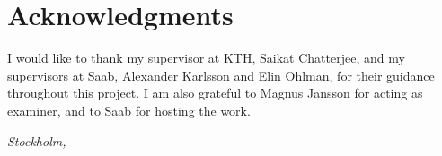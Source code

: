 \cleardoublepage%
%
\chapter*{Acknowledgments}

I would like to thank my supervisor at KTH, Saikat Chatterjee, and my supervisors at Saab, Alexander Karlsson and Elin Ohlman, for their guidance throughout this project.
I am also grateful to Magnus Jansson for acting as examiner, and to Saab for hosting the work.

\vspace{2em}
\noindent\textit{Stockholm, \thesismonth{} \thesisyear} \\
\noindent\thesisauthor%
